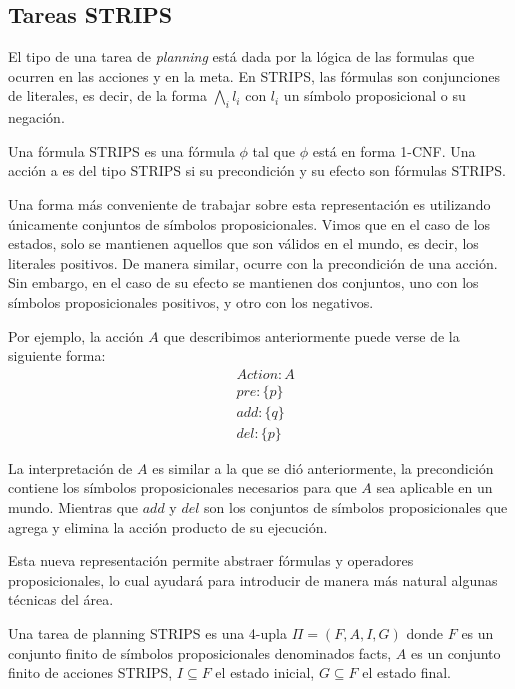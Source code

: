 \subsection{Tareas STRIPS}

El tipo de una tarea de \emph{planning} está dada por la lógica de las formulas
que ocurren en las acciones y en la meta. En STRIPS, las fórmulas son
conjunciones de literales, es decir, de la forma $\bigwedge_i l_i$ con $l_i$
un símbolo proposicional o su negación.

\begin{mydef}
    Una fórmula STRIPS es una fórmula $\phi$ tal que $\phi$ está en forma 1-CNF.
    Una acción a es del tipo STRIPS si su precondición y su efecto son fórmulas
    STRIPS.
\end{mydef}

Una forma más conveniente de trabajar sobre esta representación es utilizando
únicamente conjuntos de símbolos proposicionales. Vimos que en el caso de los
estados, solo se mantienen aquellos que son válidos en el mundo, es decir, los
literales positivos. De manera similar, ocurre con la precondición de una
acción. Sin embargo, en el caso de su efecto se mantienen dos conjuntos, uno
con los símbolos proposicionales positivos, y otro con los negativos.

Por ejemplo, la acción $A$ que describimos anteriormente puede verse
de la siguiente forma:
\begin{align*}
    & Action : A \\
    & pre : \{ p \}\\
    & add : \{ q \}\\
    & del : \{ p \}
\end{align*}

La interpretación de $A$ es similar a la que se dió anteriormente, la
precondición contiene los símbolos proposicionales necesarios para que $A$ sea
aplicable en un mundo. Mientras que $add$ y $del$ son los conjuntos de símbolos
proposicionales que agrega y elimina la acción producto de su ejecución.

Esta nueva representación permite abstraer fórmulas y operadores
proposicionales, lo cual ayudará para introducir de manera más natural algunas
técnicas del área.

\begin{mydef}
    Una tarea de planning STRIPS es una 4-upla $\Pi = (F, A, I, G)$ donde $F$ es
    un conjunto finito de símbolos proposicionales denominados facts, $A$ es un
    conjunto finito de acciones STRIPS, $I \subseteq F$ el estado inicial, $G
    \subseteq F$ el estado final.
\end{mydef}

